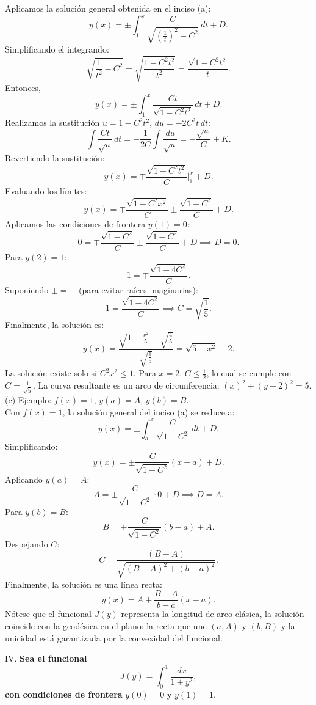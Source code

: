 \documentclass{elsarticle}
\begin{document}
Aplicamos la solución general obtenida en el inciso (a):  
\[
y(x) = \pm \int_{1}^{x} \frac{C}{\sqrt{\left(\frac{1}{t}\right)^2 - C^2}} \, dt + D.
\]  
Simplificando el integrando:  
\[
\sqrt{\frac{1}{t^2} - C^2} = \sqrt{\frac{1 - C^2 t^2}{t^2}} = \frac{\sqrt{1 - C^2 t^2}}{t}.
\]  
Entonces,  
\[
y(x) = \pm \int_{1}^{x} \frac{C t}{\sqrt{1 - C^2 t^2}} \, dt + D.
\]  
Realizamos la sustitución \( u = 1 - C^2 t^2 \), \( du = -2 C^2 t \, dt \):  
\[
\int \frac{C t}{\sqrt{u}} \, dt = -\frac{1}{2 C} \int \frac{du}{\sqrt{u}} = -\frac{\sqrt{u}}{C} + K.
\]  
Revertiendo la sustitución:  
\[
y(x) = \mp \frac{\sqrt{1 - C^2 t^2}}{C} \Bigg|_{1}^{x} + D.
\]  
Evaluando los límites:  
\[
y(x) = \mp \frac{\sqrt{1 - C^2 x^2}}{C} \pm \frac{\sqrt{1 - C^2}}{C} + D.
\]  
Aplicamos las condiciones de frontera \( y(1) = 0 \):  
\[
0 = \mp \frac{\sqrt{1 - C^2}}{C} \pm \frac{\sqrt{1 - C^2}}{C} + D \implies D = 0.
\]  
Para \( y(2) = 1 \):  
\[
1 = \mp \frac{\sqrt{1 - 4 C^2}}{C}.
\]  
Suponiendo \( \pm = - \) (para evitar raíces imaginarias):  
\[
1 = \frac{\sqrt{1 - 4 C^2}}{C} \implies C = \sqrt{\frac{1}{5}}.
\]  
Finalmente, la solución es:  
\[
y(x) = \frac{\sqrt{1 - \frac{x^2}{5}} - \sqrt{\frac{4}{5}}}{\sqrt{\frac{1}{5}}} = \sqrt{5 - x^2} - 2.
\]  
La solución existe solo si \( C^2 x^2 \leq 1 \). Para \( x = 2 \), \( C \leq \frac{1}{2} \), lo cual se cumple con \( C = \frac{1}{\sqrt{5}} \). La curva resultante es un arco de circunferencia: \( (x)^2 + (y + 2)^2 = 5 \).  \\

(c) Ejemplo: \( f(x) = 1 \), \( y(a) = A \), \( y(b) = B \).\\ 

Con \( f(x) = 1 \), la solución general del inciso (a) se reduce a:  
\[
y(x) = \pm \int_{a}^{x} \frac{C}{\sqrt{1 - C^2}} \, dt + D.
\]  
Simplificando:  
\[
y(x) = \pm \frac{C}{\sqrt{1 - C^2}} (x - a) + D.
\]  
Aplicando \( y(a) = A \):  
\[
A = \pm \frac{C}{\sqrt{1 - C^2}} \cdot 0 + D \implies D = A.
\]  
Para \( y(b) = B \):  
\[
B = \pm \frac{C}{\sqrt{1 - C^2}} (b - a) + A.
\]  
Despejando \( C \):  
\[
C = \frac{(B - A)}{\sqrt{(B - A)^2 + (b - a)^2}}.
\]  
Finalmente, la solución es una línea recta:  
\[
y(x) = A + \frac{B - A}{b - a} (x - a).
\]  
Nótese que el funcional \( J(y) \) representa la longitud de arco clásica, la solución coincide con la geodésica en el plano: la recta que une \( (a, A) \) y \( (b, B) \) y la unicidad está garantizada por la convexidad del funcional. 


IV. \textbf{Sea el funcional  }
\[
J(y) = \int_0^1 \frac{dx}{1 + y^2},
\]  
\textbf{con condiciones de frontera} \( y(0) = 0 \) y \( y(1) = 1 \).  
\end{document}
